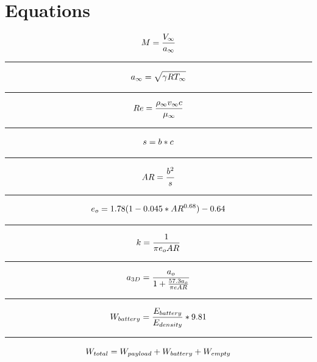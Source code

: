 \documentclass[12pt,A4paper]{article}
\begin{document}
	\section{Equations}
		\begin{equation} \label{eq1} 
			M = \frac{V_\infty }{a_\infty} \\ 
		\end{equation}
		\hrule
		\vspace{0.1 in}
		\begin{equation}
			a_\infty = \sqrt{\gamma R T_\infty} \\
		\end{equation}
		\hrule
		\vspace{0.1 in}
		\begin{equation}
			Re = \frac{\rho_\infty v_\infty c}{\mu_\infty} \\
		\end{equation}
		\hrule
		\vspace{0.1 in}
		\begin{equation}
			s = b * c \\
		\end{equation}
		\hrule
		\vspace{0.1 in}
		\begin{equation}
			AR = \frac{b^2}{s} \\
		\end{equation}
		\hrule
		\vspace{0.1 in}
		\begin{equation}
			e_o = 1.78(1 - 0.045*AR^{0.68}) - 0.64 \\
		\end{equation}
		\hrule
		\vspace{0.1 in}
		\begin{equation}
			k = \frac{1}{\pi e_o AR} \\
		\end{equation}
		\hrule
		\vspace{0.1 in}
		\begin{equation}
			a_{3D} = \frac{a_o}{1 + \frac{57.3 a_o}{\pi e AR}} \\
		\end{equation}
		\hrule
		\vspace{0.1 in}
		\begin{equation}
			W_{battery} = \frac{E_{battery}}{E_{density}} *9.81 \\
		\end{equation}
		\hrule
		\vspace{0.1 in}
		\begin{equation}
			W_{total} = W_{payload} + W_{battery} + W_{empty} \\
		\end{equation}
\end{document}
